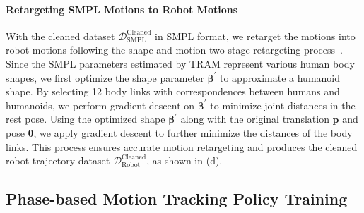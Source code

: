\paragraph{Retargeting SMPL Motions to Robot Motions}

With the cleaned dataset ${\mathcal{D}}_{\text{SMPL}}^{\text{Cleaned}}$ in SMPL format, we retarget the motions into robot motions following the shape-and-motion two-stage retargeting process~\cite{he2024learning}. Since the SMPL parameters estimated by TRAM represent various human body shapes, we first optimize the shape parameter $\boldsymbol{\beta}^{\prime}$ to approximate a humanoid shape. By selecting 12 body links with correspondences between humans and humanoids, we perform gradient descent on $\boldsymbol{\beta}^{\prime}$ to minimize joint distances in the rest pose. Using the optimized shape $\boldsymbol{\beta}^{\prime}$ along with the original translation $\boldsymbol{p}$ and pose $\boldsymbol{\theta}$, we apply gradient descent to further minimize the distances of the body links. This process ensures accurate motion retargeting and produces the cleaned robot trajectory dataset ${\mathcal{D}}_{\text{Robot}}^{\text{Cleaned}}$, as shown in  (d). 

\subsection{Phase-based Motion Tracking Policy Training}

